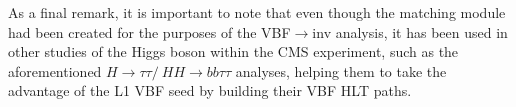 \hspace{10pt} As a final remark, it is important to note that even though the matching module had been created for the purposes of the VBF$\rightarrow$inv analysis, it has been used in other studies of the Higgs boson within the CMS experiment, such as the aforementioned $H\rightarrow \tau\tau /~ HH\rightarrow bb\tau\tau$ analyses, helping them to take the advantage of the L1 VBF seed by building their VBF HLT paths.

 





\begin{center}
    \expandafter\pgfornament\expandafter{88}
\end{center}
\restoregeometry